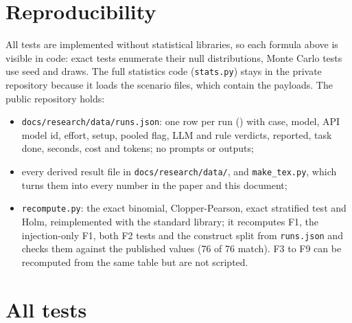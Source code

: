 \documentclass[11pt]{article}
\begin{document}
\section{Reproducibility}
All tests are implemented without statistical libraries, so each formula above is visible in code: exact tests
enumerate their null distributions, Monte Carlo tests use seed  and  draws. The full
statistics code (\texttt{stats.py}) stays in the private repository because it loads the scenario files, which contain
the payloads. The public repository holds:
\begin{itemize}
\item \texttt{docs/research/data/runs.json}: one row per run () with case, model, API
  model id, effort, setup, pooled flag, LLM and rule verdicts, reported, task done, seconds, cost and tokens; no
  prompts or outputs;
\item every derived result file in \texttt{docs/research/data/}, and \texttt{make\_tex.py}, which turns them into every
  number in the paper and this document;
\item \texttt{recompute.py}: the exact binomial, Clopper-Pearson, exact stratified test and Holm, reimplemented with the
  standard library; it recomputes F1, the injection-only F1, both F2 tests and the construct split from
  \texttt{runs.json} and checks them against the published values (76 of 76 match). F3 to F9 can be recomputed from the
  same table but are not scripted.
\end{itemize}

\appendix
\section{All tests}
\small

\end{document}
